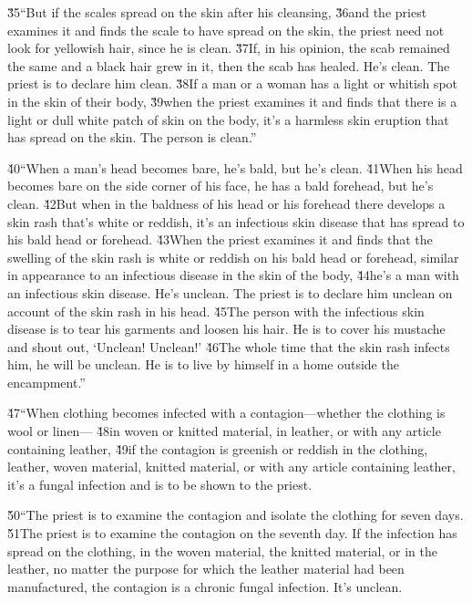 \v{35}``But if the scales spread on the skin after his cleansing, \v{36}and the priest examines it and finds the scale to have spread on the skin, the priest need not look for yellowish hair, since he is clean. \v{37}If, in his opinion, the scab remained the same and a black hair grew in it, then the scab has healed. He's clean. The priest is to declare him clean. \v{38}If a man or a woman has a light or whitish spot in the skin of their body, \v{39}when the priest examines it and finds that there is a light or dull white patch of skin on the body, it's a harmless skin eruption that has spread on the skin. The person is clean.''

\v{40}``When a man's head becomes bare, he's bald, but he's clean. \v{41}When his head becomes bare on the side corner of his face, he has a bald forehead, but he's clean. \v{42}But when in the baldness of his head or his forehead there develops a skin rash that's white or reddish, it's an infectious skin disease that has spread to his bald head or forehead. \v{43}When the priest examines it and finds that the swelling of the skin rash is white or reddish on his bald head or forehead, similar in appearance to an infectious disease in the skin of the body, \v{44}he's a man with an infectious skin disease. He's unclean. The priest is to declare him unclean on account of the skin rash in his head. \v{45}The person with the infectious skin disease is to tear his garments and loosen his hair. He is to cover his mustache and shout out, `Unclean! Unclean!' \v{46}The whole time that the skin rash infects him, he will be unclean. He is to live by himself in a home outside the encampment.''

\v{47}``When clothing becomes infected with a contagion---whether the clothing is wool or linen--- \v{48}in woven or knitted material, in leather, or with any article containing leather, \v{49}if the contagion is greenish or reddish in the clothing, leather, woven material, knitted material, or with any article containing leather, it's a fungal infection and is to be shown to the priest.

\v{50}``The priest is to examine the contagion and isolate the clothing for seven days. \v{51}The priest is to examine the contagion on the seventh day. If the infection has spread on the clothing, in the woven material, the knitted material, or in the leather, no matter the purpose for which the leather material had been manufactured, the contagion is a chronic fungal infection. It's unclean.


